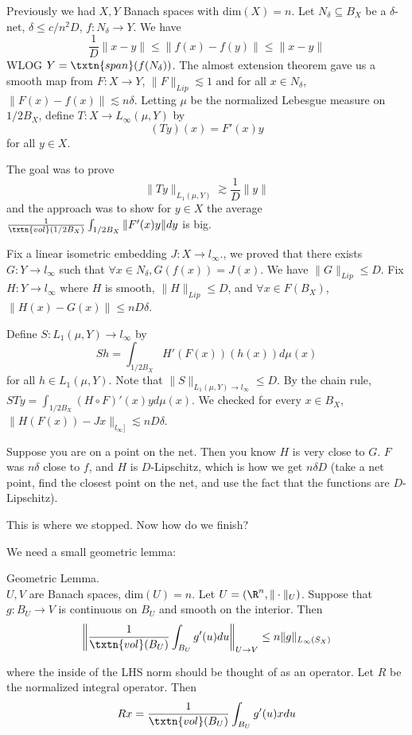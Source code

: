 

Previously we had $X, Y$ Banach spaces with dim$(X) = n$. Let $N_{\delta} \subseteq B_X$ be a $\delta$-net, $\delta \leq c/n^2D$, $f: N_{\delta} \to Y$. 
We have 
\[
\frac{1}{D}\|x - y\| \leq \|f(x) - f(y)\| \leq \|x - y\|
\]
WLOG $Y = \txtn{span}(f(N_{\delta}))$. 
The almost extension theorem gave us a smooth map from $F:X \to Y$, $\|F\|_{Lip} \lesssim 1$ and for all $x \in N_{\delta}$, $\|F(x) - f(x)\| \lesssim n\delta$. 
Letting $\mu$ be the normalized Lebesgue measure on $1/2 B_X$, define $T:X \to L_{\infty}(\mu, Y)$ by
\[
(Ty)(x) = F'(x)y
\]
for all $y \in X$. 

The goal was to prove 
\[
\|Ty\|_{L_1(\mu, Y)} \gtrsim \frac{1}{D}\|y\|
\]
and the approach was to show for $y \in X$ the average $\frac{1}{\txtn{vol}(1/2 B_X)}\int_{1/2 B_X}\|F'(x)y\| dy$ is big. 

Fix a linear isometric embedding $J: X \to l_{\infty}$., we proved that there exists $G: Y \to l_{\infty}$ such that $\forall x \in N_{\delta}, G(f(x)) = J(x)$. We have $\|G\|_{Lip} \leq D$. Fix $H: Y \to l_{\infty}$ where $H$ is smooth, $\|H\|_{Lip} \leq D$, and $\forall x \in F(B_X)$, $\|H(x) - G(x)\| \leq nD\delta$. 

Define $S: L_1(\mu, Y) \to l_{\infty}$ by
\[
Sh = \int_{1/2 B_X}H'(F(x))(h(x)) d\mu(x)
\]
for all $h \in L_1(\mu, Y)$. Note that $\|S\|_{L_1(\mu, Y) \to l_{\infty}} \leq D$. 
By the chain rule, $STy = \int_{1/2 B_X}(H \circ F)'(x)y d\mu(x)$. 
We checked for every $x \in B_X$, $\|H(F(x)) - Jx\|_{l_{\infty}]} \lesssim nD\delta$. 

Suppose you are on a point on the net. Then you know $H$ is very close to $G$. $F$ was $n\delta$ close to $f$, and $H$ is $D$-Lipschitz, which is how we get $n\delta D$ (take a net point, find the closest point on the net, and use the fact that the functions are $D$-Lipschitz).

This is where we stopped. Now how do we finish? 

We need a small geometric lemma: 

\begin{lem} Geometric Lemma.  \label{lem:geolem}\\
$U, V$ are Banach spaces, dim$(U) = n$. Let $U = (\R^n, \|\cdot\|_U)$. 
Suppose that $g: B_U \to V$ is continuous on $B_U$ and smooth on the interior. 
Then 
\[
\left\|\frac{1}{\txtn{vol}(B_U)}\int_{B_U} g'(u) du\right\|_{U \to V} \leq n\|g\|_{L_{\infty}(S_X)}
\]
\end{lem}
where the inside of the LHS norm should be thought of as an operator. Let $R$ be the normalized integral operator. Then 
\[
Rx = \frac{1}{\txtn{vol}(B_U)}\int_{B_U} g'(u)x du
\]

